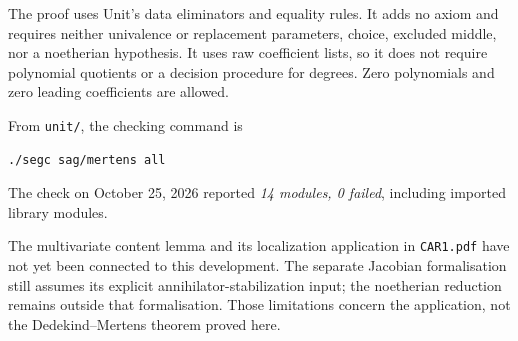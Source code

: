 \documentclass[11pt]{amsart}
\newcommand{\code}[1]{\texttt{#1}}
\begin{document}
The proof uses Unit's data eliminators and equality rules. It adds
no axiom and requires neither univalence or replacement parameters,
choice, excluded middle, nor a noetherian hypothesis. It uses raw
coefficient lists, so it does not require polynomial quotients or a
decision procedure for degrees. Zero polynomials and zero leading
coefficients are allowed.

From \code{unit/}, the checking command is
\begin{verbatim}
./segc sag/mertens all
\end{verbatim}
The check on October 25, 2026 reported \emph{14 modules, 0 failed},
including imported library modules.

The multivariate content lemma and its localization application in
\code{CAR1.pdf} have not yet been connected to this development.
The separate Jacobian formalisation still assumes its explicit
annihilator-stabilization input; the noetherian reduction remains
outside that formalisation. Those limitations concern the application,
not the Dedekind--Mertens theorem proved here.
\end{document}
